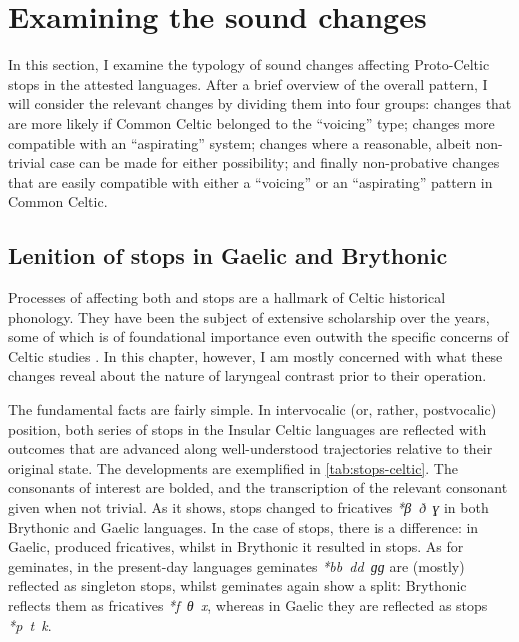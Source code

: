 \documentclass[output=paper,colorlinks,citecolor=brown]{langscibook}
\begin{document}
\section{Examining the sound changes}
\label{sec:exam-sound-chang}

In this section, I examine the typology of sound changes affecting Proto\hyp Celtic stops in the attested languages. After a brief overview of the overall pattern, I will consider the relevant changes by dividing them into four groups: changes that are more likely if Common Celtic belonged to the \enquote{voicing} type; changes more compatible with an \enquote{aspirating} system; changes where a reasonable, albeit non\hyp trivial case can be made for either possibility; and finally non\hyp probative changes that are easily compatible with either a \enquote{voicing} or an \enquote{aspirating} pattern in Common Celtic.

\subsection{Lenition of stops in Gaelic and Brythonic}
\label{sec:lenit-stops-gael}

Processes of  affecting both  and  stops are a hallmark of Celtic historical phonology. They have been the subject of extensive scholarship over the years, some of which is of foundational importance even outwith the specific concerns of Celtic studies \parencite[such as][]{mart55}. In this chapter, however, I am mostly concerned with what these changes reveal about the nature of laryngeal contrast prior to their operation.

The fundamental facts are fairly simple. In intervocalic (or, rather, postvocalic) position, both series of stops in the Insular Celtic languages are reflected with outcomes that are advanced along well\hyp understood  trajectories relative to their original state. The developments are exemplified in \cref{tab:stops-celtic}. The consonants of interest are bolded, and the transcription of the relevant consonant given when not trivial. As it shows,  stops changed to  fricatives \textit{*β~ð~ɣ} in both Brythonic and Gaelic languages. In the case of  stops, there is a difference: in Gaelic,  produced  fricatives, whilst in Brythonic it resulted in  stops. As for geminates, in the present\hyp day languages  geminates \textit{*bb~dd~ɡɡ} are (mostly) reflected as singleton  stops, whilst  geminates again show a split: Brythonic reflects them as  fricatives \textit{*f~θ~x}, whereas in Gaelic they are reflected as  stops \textit{*p~t~k}.
\end{document}
